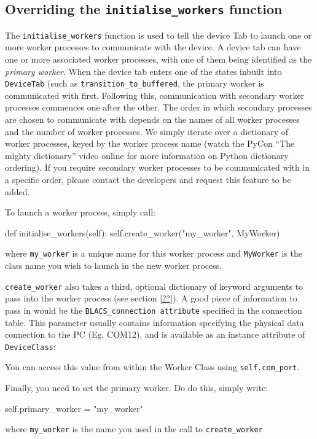 \documentclass[12pt]{article}
\begin{document}
\subsection{Overriding the \texttt{initialise\_workers} function}
The \texttt{initialise\_workers} function is used to tell the device Tab to launch one or more worker processes to communicate with the device.
A device tab can have one or more associated worker processes, with one of them being identified as the \textit{primary worker}.
When the device tab enters one of the states inbuilt into \texttt{DeviceTab} (such as \texttt{transition\_to\_buffered}, the primary worker is communicated with first. 
Following this, communication with secondary worker processes commences one after the other.
The order in which secondary processes are chosen to communicate with depends on the names of all worker processes and the number of worker processes.
We simply iterate over a dictionary of worker processes, keyed by the worker process name (watch the PyCon ``The mighty dictionary'' video online for more information on Python dictionary ordering).
If you require secondary worker processes to be communicated with in a specific order, please contact the developers and request this feature to be added.

To launch a worker process, simply call:
\begin{python}
def initialise_workers(self):
    self.create_worker("my_worker", MyWorker)
\end{python}
where \texttt{my\_worker} is a unique name for this worker process and \texttt{MyWorker} is the class name you wish to launch in the new worker process.

\texttt{create\_worker} also takes a third, optional dictionary of keyword arguments to pass into the worker process (see section \ref{??}).
A good piece of information to pass in would be the \texttt{BLACS\_connection attribute} specified in the connection table.
This parameter usually contains information specifying the physical data connection to the PC (Eg. COM12), and is available as an instance attribute of \texttt{DeviceClass}:
\begin{python}
def initialise_workers(self):
    self.create_worker("my_worker", MyWorker,{'com_port':str(self.BLACS_connection))
\end{python}
You can access this value from within the Worker Class using \texttt{self.com\_port}.

Finally, you need to set the primary worker.
Do do this, simply write:
\begin{python}
    self.primary_worker = "my_worker"
\end{python}
where \texttt{my\_worker} is the name you used in the call to \texttt{create\_worker}
\end{document}
